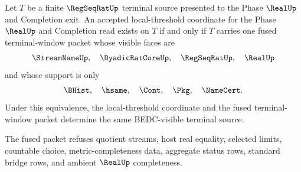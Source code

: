 \begin{theorem}
\label{thm:regseqrat-local-threshold-terminal-window-fusion}
Let $T$ be a finite $\RegSeqRatUp$ terminal source presented to the Phase $\RealUp$ and Completion exit. An accepted local-threshold coordinate for the Phase $\RealUp$ and Completion read exists on $T$ if and only if $T$ carries one fused terminal-window packet whose visible faces are
$$
\StreamNameUp,\quad \DyadicRatCoreUp,\quad \RegSeqRatUp,\quad \RealUp
$$
and whose support is only
$$
\BHist,\quad \hsame,\quad \Cont,\quad \Pkg,\quad \NameCert.
$$
Under this equivalence, the local-threshold coordinate and the fused terminal-window packet determine the same BEDC-visible terminal source.

The fused packet refuses quotient streams, host real equality, selected limits, countable choice, metric-completeness data, aggregate status rows, standard bridge rows, and ambient $\RealUp$ completeness.
\end{theorem}
